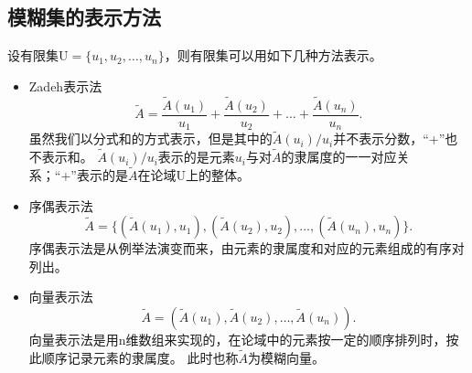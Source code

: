 \subsection{模糊集的表示方法}
设有限集$\mathrm{U}=\{u_1,u_2,\dots ,u_n\}$，则有限集可以用如下几种方法表示\cite{模糊数学李安贵}。
\begin{itemize}
    \item Zadeh表示法
          \[
              \tilde{A}=\frac{\tilde{A}(u_1)}{u_1}+\frac{\tilde{A}(u_2)}{u_2}+ \dots +\frac{\tilde{A}(u_n)}{u_n}.
          \]
          虽然我们以分式和的方式表示，但是其中的$\tilde{A}(u_i)/u_i$并不表示分数，“+”也不表示和。
          $\tilde{A}(u_i)/u_i$表示的是元素$u_i$与对$\tilde{A}$的隶属度的一一对应关系；“+”表示的是$\tilde{A}$在论域$\mathrm{U}$上的整体。\newpage
    \item 序偶表示法
          \[
              \tilde{A}=\{(\tilde{A}(u_1),u_1),(\tilde{A}(u_2),u_2),\dots ,(\tilde{A}(u_n),u_n)\}.
          \]
          序偶表示法是从例举法演变而来，由元素的隶属度和对应的元素组成的有序对列出。
    \item 向量表示法
          \[
              \tilde{A}=(\tilde{A}(u_1),\tilde{A}(u_2),\dots ,\tilde{A}(u_n)).
          \]
          向量表示法是用n维数组来实现的，在论域中的元素按一定的顺序排列时，按此顺序记录元素的隶属度。
          此时也称$\tilde{A}$为模糊向量。
\end{itemize}
